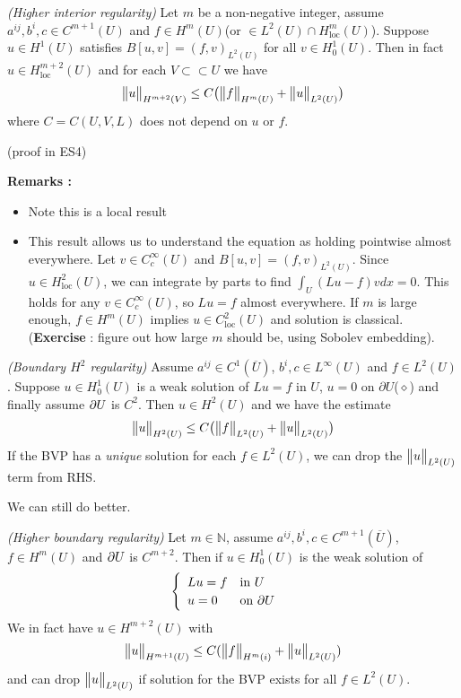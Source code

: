 \documentclass[10pt,a4paper]{report}
\begin{document}
\thm \emph{(Higher interior regularity)} Let $m$ be a non-negative integer, assume $a^{ij},b^{i}, c\in C^{m+1}(U)$ and $f\in H^m (U)$(or $\in L^2(U)\cap H^m_{\text{loc}}(U)$). Suppose $u\in H^1(U)$ satisfies $B[u,v] = (f,v)_{L^2(U)}$ for all $v\in H_0^1(U)$. Then in fact $u\in H^{m+2}_{\text{loc}}(U)$ and for each $V\subset\subset U$ we have
\begin{align*}
\bigl\lVert u\bigr\rVert_{H^{m+2}(V)} \leq C \big( \bigl\lVert f\bigr\rVert_{H^m(U)} + \bigl\lVert u\bigr\rVert_{L^2(U)} \big)
\end{align*}
where $C= C(U,V,L)$ does not depend on $u$ or $f$.

(proof in ES4)
\s

\textbf{Remarks :}
\begin{itemize}
\item Note this is a local result
\item This result allows us to understand the equation as holding pointwise almost everywhere. Let $v\in C_c^{\infty}(U)$ and $B[u,v] = (f,v)_{L^2(U)}$. Since $u\in H^2_{\text{loc}}(U)$, we can integrate by parts to find $\int_U (Lu -f) v dx = 0$. This holds for any $v\in C_c^{\infty}(U)$, so $Lu = f$ almost everywhere. If $m$ is large enough, $f\in H^m(U)$ implies $u\in C^2_{\text{loc}}(U)$ and solution is classical. (\textbf{Exercise} : figure out how large $m$ should be, using Sobolev embedding).
\end{itemize}
\s

\thm \emph{(Boundary $H^2$ regularity)} Assume $a^{ij}\in C^1(\overline{U})$, $b^i,c\in L^{\infty}(U)$ and $f\in L^2(U)$. Suppose $u\in H_0^1(U)$ is a weak solution of $Lu =f$ in $U$, $u=0$ on $\partial U$($\diamond$) and finally assume $\partial U$ is $C^2$. Then $u\in H^2(U)$ and we have the estimate
\begin{align*}
\bigl\lVert u\bigr\rVert_{H^2(U)} \leq C \big( \bigl\lVert f\bigr\rVert_{L^2(U)} + \bigl\lVert u\bigr\rVert_{L^2(U)} \big)
\end{align*}
If the BVP has a \emph{unique} solution for each $f\in L^2(U)$, we can drop the $\bigl\lVert u\bigr\rVert_{L^2(U)}$ term from RHS.
\s

We can still do better.
\s

\thm \emph{(Higher boundary regularity)} Let $m\in \mathbb{N}$, assume $a^{ij},b^i,c\in C^{m+1}(\overline{U})$, $f\in H^m(U)$ and $\partial U$ is $C^{m+2}$. Then if $u\in H_0^1(U)$ is the weak solution of
\begin{align*}
\begin{cases}
\begin{array}{ll}
Lu =f  & \text{in } U \\
u =0 & \text{on } \partial U
\end{array}
\end{cases}
\end{align*}
We in fact have $u\in H^{m+2}(U)$ with
\begin{align*}
\bigl\lVert u\bigr\rVert_{H^{m+1}(U)} \leq C(\bigl\lVert f\bigr\rVert_{H^{m}(i)} + \bigl\lVert u\bigr\rVert_{L^2(U)})
\end{align*}
and can drop $\bigl\lVert u\bigr\rVert_{L^2(U)}$ if solution for the BVP exists for all $f\in L^2(U)$.
\s
\end{document}
